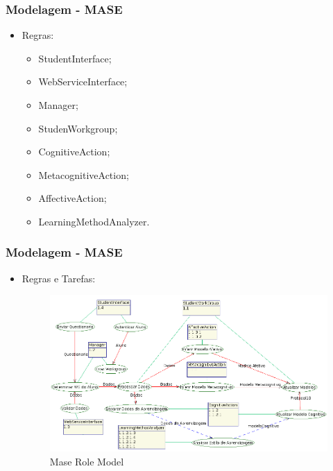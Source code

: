 \documentclass{beamer}
\begin{document}
\begin{frame}
    \frametitle{Modelagem - MASE}
    \begin{itemize}
        \item Regras:
	\begin{itemize}
		\item StudentInterface;
		\item WebServiceInterface;
		\item Manager;
		\item StudenWorkgroup;
		\item CognitiveAction;
		\item MetacognitiveAction;
		\item AffectiveAction;
		\item LearningMethodAnalyzer.
	\end{itemize}
    \end{itemize}
\end{frame}

\begin{frame}
    \frametitle{Modelagem - MASE}
    \begin{itemize}
        \item Regras e Tarefas:
	 \begin{figure}[h]
    		\centering \includegraphics[scale=0.3]{../images/mase-role-model.png}
    		\caption{Mase Role Model}
		\label{maseRoleModel} 
	\end{figure}
    \end{itemize}
\end{frame}
\end{document}
